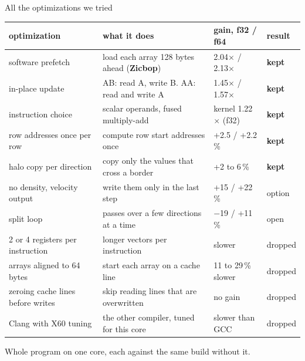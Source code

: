 \documentclass[aspectratio=169,10pt,t]{beamer}
\newcommand{\sx}[1]{#1\ensuremath{\times}} %
\newcommand{\term}[1]{\textcolor{psblue!85!black}{\textbf{#1}}} %
\begin{document}
\begin{frame}{All the optimizations we tried}
  \vspace{1mm}
  {\footnotesize\renewcommand{\arraystretch}{1.12}
  \newcommand{\kept}{\textcolor{psteal!85!black}{\textbf{kept}}}
  \newcommand{\dropped}{\textcolor{psred!85!black}{dropped}}
  \newcommand{\optional}{\textcolor{psorange!90!black}{option}}
  \newcommand{\open}{\textcolor{psorange!90!black}{open}}
  \begin{tabularx}{\textwidth}{@{}l>{\raggedright\arraybackslash}Xll@{}}
    \toprule
    \textbf{optimization} & \textbf{what it does} & \textbf{gain, f32 / f64} & \textbf{result}\\
    \midrule
    software prefetch & load each array 128 bytes ahead (\term{Zicbop}) & \sx{2.04} / \sx{2.13} & \kept\\
    in-place update & AB: read A, write B. AA: read and write A & \sx{1.45} / \sx{1.57} & \kept\\
    instruction choice & scalar operands, fused multiply-add & kernel \sx{1.22} (f32) & \kept\\
    row addresses once per row & compute row start addresses once & +2.5 / +2.2\,\% & \kept\\
    halo copy per direction & copy only the values that cross a border & +2 to 6\,\% & \kept\\
    no density, velocity output & write them only in the last step & +15 / +22\,\% & \optional\\
    split loop & passes over a few directions at a time & $-$19 / +11\,\% & \open\\
    \midrule
    2 or 4 registers per instruction & longer vectors per instruction & slower & \dropped\\
    arrays aligned to 64 bytes & start each array on a cache line & 11 to 29\,\% slower & \dropped\\
    zeroing cache lines before writes & skip reading lines that are overwritten & no gain & \dropped\\
    Clang with X60 tuning & the other compiler, tuned for this core & slower than GCC & \dropped\\
    \bottomrule
  \end{tabularx}\par}

  \vspace{1.5mm}
  {\scriptsize\color{psgray}Whole program on one core, each against the same build without it.\par}
\end{frame}
\end{document}
